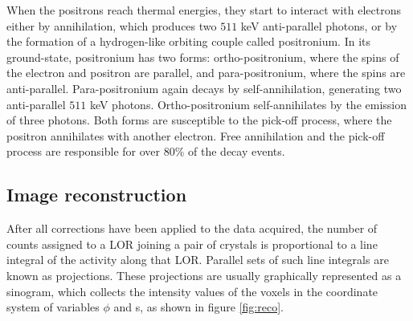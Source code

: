 When the positrons reach thermal energies, they start to interact with electrons either by annihilation, which produces two $511$ keV anti-parallel photons, or by the formation of a hydrogen-like orbiting couple called positronium. In its ground-state, positronium has two forms: ortho-positronium, where the spins of the electron and positron are parallel, and para-positronium, where the spins are anti-parallel. Para-positronium again decays by self-annihilation, generating two anti-parallel $511$ keV photons. Ortho-positronium self-annihilates by the emission of three photons. Both forms are susceptible to the pick-off process, where the positron annihilates with another electron. Free annihilation and the pick-off process are responsible for over $80\%$ of the decay events.

\subsection{Image reconstruction}

After all corrections have been applied to the data acquired, the number of counts assigned to a LOR joining a pair of crystals is proportional to a line integral of the activity along that LOR. Parallel sets of such line integrals are known as projections.
These projections are usually graphically represented as a sinogram, which collects the intensity values of the voxels in the coordinate system of variables $\phi$ and s, as shown in figure \ref{fig:reco}.

